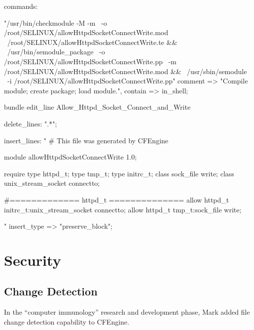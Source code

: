 \begin{codelisting}
\begin{code}
{  commands:

      "/usr/bin/checkmodule  -M -m \
-o /root/SELINUX/allowHttpdSocketConnectWrite.mod \
/root/SELINUX/allowHttpdSocketConnectWrite.te && \
/usr/bin/semodule_package \
-o /root/SELINUX/allowHttpdSocketConnectWrite.pp \
-m /root/SELINUX/allowHttpdSocketConnectWrite.mod && \
/usr/sbin/semodule \
-i /root/SELINUX/allowHttpdSocketConnectWrite.pp"
        comment => "Compile module; create package; load module.",
        contain => in_shell;

}


bundle edit_line Allow_Httpd_Socket_Connect_and_Write {

      delete_lines: ".*";

  insert_lines:
      "
# This file was generated by CFEngine

module allowHttpdSocketConnectWrite 1.0;

require {
type httpd_t;
type tmp_t;
type initrc_t;
class sock_file write;
class unix_stream_socket connectto;
}

#============= httpd_t ==============
allow httpd_t initrc_t:unix_stream_socket connectto;
allow httpd_t tmp_t:sock_file write;

"
        insert_type => "preserve_block";
}
\end{code}
\end{codelisting}





\section{Security}

\subsection{Change Detection}

In the ``computer immunology'' research and development phase, Mark added file change detection capability to CFEngine.

